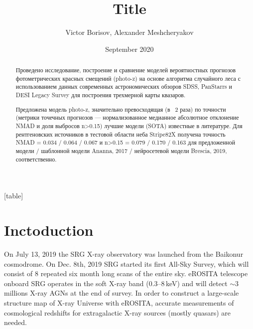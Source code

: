 \documentclass[fleqn,usenatbib]{mnras}
\title[ShortTitle]{Title}
\author[Borisov et al.]{Victor Borisov, Alexander Meshcheryakov %
}
\date{September 2020}
\begin{document}
[table]
\renewcommand{\therowcntr}{\arabic{rowcntr}}
\newcolumntype{N}{>{\refstepcounter{rowcntr}\therowcntr}c}

\newcommand{\expnumber}[2]{{#1}\mathrm{e}{#2}}

\maketitle
\begin{abstract}
Проведено исследование, построение и сравнение моделей вероятностных прогнозов фотометрических красных смещений (photo-z) на основе алгоритма случайного леса  с использованием данных современных астрономических обзоров SDSS, PanStarrs и DESI Legacy Survey для построения трехмерной карты квазаров.

Предложена модель photo-z, значительно превосходящая (в ~2 раза) по точности (метрики точечных прогнозов — нормализованное медианное абсолютное отклонение NMAD и доля выбросов n>0.15) лучшие модели (SOTA) известные в литературе. Для рентгеновских источников в тестовой области неба Stripe82X получена точность NMAD = 0.034 / 0.064 / 0.067 и n>0.15 = 0.079 / 0.170 / 0.163 для предложенной модели / шаблонной модели Ananna, 2017 / нейросетевой модели Brescia, 2019, соответственно.
\end{abstract}



\section{Inctoduction}

On July 13, 2019 the SRG X-ray observatory
was launched from the Baikonur cosmodrome. On Dec. 8th, 2019 SRG started its first All-Sky Survey, which will consist of 8 repeated six month long scans of the entire sky. eROSITA telescope \citep{2020arXiv201003477P} onboard SRG operates in the soft X-ray band (0.3–8\,keV) and will detect $\sim3$ millions X-ray AGNs at the end of survey. In order to construct a large-scale structure map of X-ray Universe with eROSITA, accurate measurements of cosmological redshifts for extragalactic X-ray sources (mostly quasars) are needed.
\end{document}
